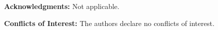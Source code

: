 \noindent\textbf{Acknowledgments:} Not applicable.

\noindent\textbf{Conflicts of Interest:} The authors declare no conflicts of interest.

\normalsize
\vspace{0.5\baselineskip}


